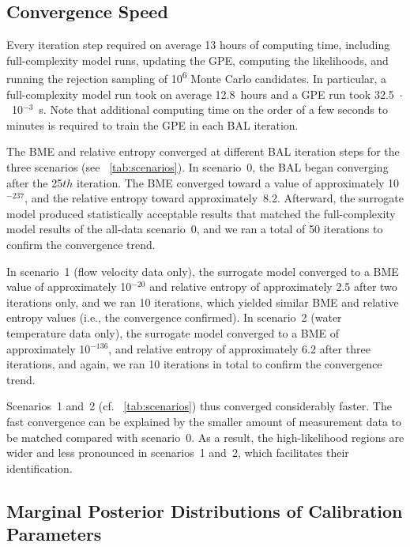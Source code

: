 \documentclass[draft,linenumbers,onecolumn]{agujournal2019} %
\begin{document}
\subsection{Convergence Speed}
Every iteration step required on average 13 hours of computing time, including full-complexity model runs, updating the GPE, computing the likelihoods, and running the rejection sampling of 10\textsuperscript{6} Monte Carlo candidates. In particular, a full-complexity model run took on average 12.8~hours and a GPE run took 32.5~$\cdot$~10$^{-3}$~s. Note that additional computing time on the order of a few seconds to minutes is required to train the GPE in each BAL iteration.

The BME and relative entropy converged at different BAL iteration steps for the three scenarios (see \tablename{~\ref{tab:scenarios}}). In scenario~0, the BAL began converging after the 25${th}$ iteration. The BME converged toward a value of approximately 10$^{-237}$, and the relative entropy toward approximately~8.2. Afterward, the surrogate model produced statistically acceptable results that matched the full-complexity model results of the all-data scenario~0, and we ran a total of 50 iterations to confirm the convergence trend.

In scenario~1 (flow velocity data only), the surrogate model converged to a BME value of approximately 10$^{-20}$ and relative entropy of approximately 2.5 after two iterations only, and we ran 10 iterations, which yielded similar BME and relative entropy values (i.e., the convergence confirmed). In scenario~2 (water temperature data only), the surrogate model converged to a BME of approximately 10$^{-136}$, and relative entropy of approximately 6.2 after three iterations, and again, we ran 10 iterations in total to confirm the convergence trend.

Scenarios~1 and~2 (cf. \tablename{~\ref{tab:scenarios}}) thus converged considerably faster. The fast convergence can be explained by the smaller amount of measurement data to be matched compared with scenario~0. As a result, the high-likelihood regions are wider and less pronounced in scenarios~1 and~2, which facilitates their identification.

\subsection{Marginal Posterior Distributions of Calibration Parameters}
\end{document}
